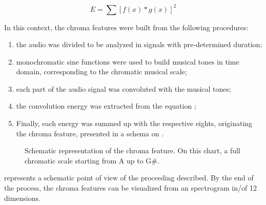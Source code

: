 \documentclass{article}
\begin{document}
	\begin{equation}\label{ccm_equation}
		E = \sum [f(x)*g(x)]^{2}
	\end{equation}

	In this context, the chroma features were built from the following procedures:
	\begin{enumerate}
		\item the audio was divided to be analyzed in signals with pre-determined duration;
		\item monochromatic sine functions were used to build musical tones in time domain, corresponding to the chromatic musical scale;
		\item each part of the audio signal was convoluted with the musical tones;
		\item the convolution energy was extracted from the equation ;
		\item Finally, each energy was summed up with the respective eights, originating the chroma feature, presented in a schema on .
	\end{enumerate}

	
	\begin{figure}[h!]
		 \centerline{}
		 \caption{Schematic representation of the chroma feature. On this chart, a full chromatic scale starting from A up to G\#.}
		 \label{fig:chroma_feature}
		\end{figure}

	 represents a schematic point of view of the proceeding described. By the end of the process, the chroma features can be visualized from an spectrogram in/of  12 dimensions.
\end{document}
